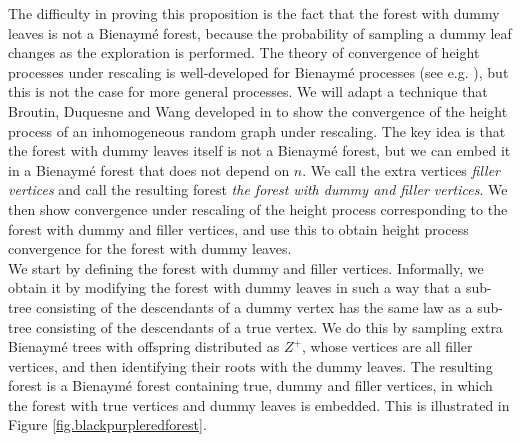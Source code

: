 The difficulty in proving this proposition is the fact that the forest with dummy leaves is not a Bienaymé forest, because the probability of sampling a dummy leaf changes as the exploration is performed. The theory of convergence of height processes under rescaling is well-developed for Bienaymé processes (see e.g. \citet{AST_2002__281__R1_0}), but this is not the case for more general processes.  We will adapt a technique that Broutin, Duquesne and Wang developed in \cite{broutinLimitsMultiplicativeInhomogeneous2021} to show the convergence of the height process of an inhomogeneous random graph under rescaling. The key idea is that  the forest with dummy leaves itself is not a Bienaymé forest, but we can embed it in a Bienaymé forest that does not depend on $n$. We call the extra vertices \emph{filler vertices} and call the resulting forest \emph{the forest with dummy and filler vertices}. We then show convergence under rescaling of the height process corresponding to the forest with dummy and filler vertices, and use this to obtain height process convergence for the forest with dummy leaves. \\
We start by defining the forest with dummy and filler vertices. Informally, we obtain it by modifying the forest with dummy leaves in such a way that a sub-tree consisting of the descendants of a dummy vertex has the same law as a sub-tree consisting of the descendants of a true vertex. We do this by sampling extra Bienaymé trees with offspring distributed as $Z^+$, whose vertices are all filler vertices, and then identifying their roots with the dummy leaves. The resulting forest is a Bienaymé forest containing true, dummy and filler vertices, in which the forest with true vertices and dummy leaves is embedded. This is illustrated in Figure \ref{fig.blackpurpleredforest}. 

